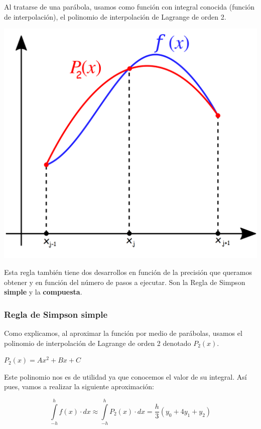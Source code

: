 \documentclass{article}
\begin{document}
	Al tratarse de una parábola, usamos como función con integral conocida (función de interpolación), el polinomio de interpolación de Lagrange de orden 2.\\
	
	\begin{center}
		\includegraphics[scale=0.26]{intro}
	\end{center}
	
	Esta regla también tiene dos desarrollos en función de la precisión que queramos obtener y en función del número de pasos a ejecutar. Son la Regla de Simpson \textbf{simple} y la \textbf{compuesta}.
	
		\subsubsection{Regla de Simpson simple}
			
			Como explicamos, al aproximar la función por medio de parábolas, usamos el polinomio de interpolación de Lagrange de orden 2 denotado $P_2(x)$.
			
			\begin{center}
				$P_2(x)=Ax^2+Bx+C$
			\end{center}
			
			Este polinomio nos es de utilidad ya que conocemos el valor de su integral. Así pues, vamos a realizar la siguiente aproximación:
			
			\begin{equation}\label{eq:rss}
				\int \limits_{-h}^{h} f(x) \cdot dx \approx 
				\int \limits_{-h}^{h} P_2(x) \cdot dx =
				\frac{h}{3}(y_0+4y_1+y_2)
			\end{equation}
			
\end{document}
